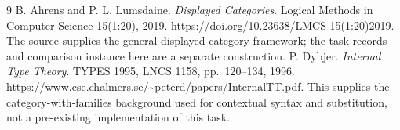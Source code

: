 \documentclass[11pt]{article}
\begin{document}
\begin{thebibliography}{9}
B. Ahrens and P. L. Lumsdaine.
\emph{Displayed Categories}. Logical Methods in Computer Science
15(1:20), 2019.
\url{https://doi.org/10.23638/LMCS-15(1:20)2019}.
The source supplies the general displayed-category framework; the task
records and comparison instance here are a separate construction.
P. Dybjer. \emph{Internal Type Theory}.
TYPES 1995, LNCS 1158, pp.~120--134, 1996.
\url{https://www.cse.chalmers.se/~peterd/papers/InternalTT.pdf}.
This supplies the category-with-families background used for contextual
syntax and substitution, not a pre-existing implementation of this task.
\end{thebibliography}
\end{document}
